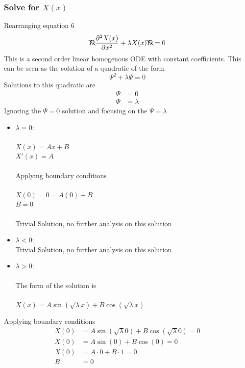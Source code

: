 \documentclass[a4paper]{article}
\newcommand*{\pd}[3][]{\ensuremath{\frac{\partial^{#1} #2}{\partial #3}}}
\begin{document}
\subsubsection{Solve for $X(x)$}
Rearranging equation 6
\begin{align*}
\bcancel{D} \pd[2]{X(x)}{x^2} + \lambda X(x) \bcancel{D} = 0
\end{align*}
This is a second order linear homogenous ODE with constant coefficients. 
This can be seen as the solution of a quadratic of the form 
\begin{equation*}
 \Psi^{2} + \lambda \Psi = 0
\end{equation*}
Solutions to this quadratic are
\begin{align*}
 \Psi &= 0 \\
 \Psi &= \lambda
\end{align*}
Ignoring the $\Psi = 0$ solution and focusing on the $\Psi = \lambda$
\begin{itemize}
 \item $\lambda = 0$: \\ \\
	$X(x) = Ax + B$ \\
	$X'(x) = A$\\ \\ 
	Applying boundary conditions \\ \\
	$X(0) = 0 = A(0) + B$\\
	$B = 0$ \\ \\
	Trivial Solution, no further analysis on this solution
 \item $\lambda < 0$:  \\
	Trivial Solution, no further analysis on this solution
 \item $\lambda > 0$:  \\ \\
	The form of the solution is \\ \\ 
	$X(x) = A \sin(\sqrt{\lambda}x) + B \cos(\sqrt{\lambda}x)$
\end{itemize}
Applying boundary conditions
\begin{align*}
X(0) &= A \sin(\sqrt{\lambda}0) + B \cos(\sqrt{\lambda}0) = 0\\
X(0) &= A \sin(0) + B \cos(0) = 0 \\
X(0) &= A \cdot 0 + B \cdot 1 = 0 \\
B &= 0 
\end{align*}
\end{document}
